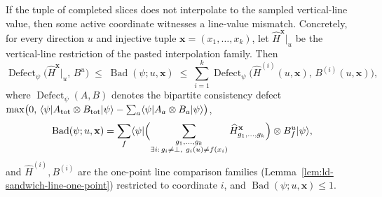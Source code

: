 \begin{lemma}\label{lem:line-interpolation-mismatch-estimates}
	\leanok
	If the tuple of completed slices does not interpolate to the sampled
	vertical-line value, then some active coordinate witnesses a line-value
	mismatch. Concretely, for every direction $u$ and injective tuple
	$\mathbf{x}=(x_1,\dots,x_k)$, let $\widehat{H}^{\mathbf{x}}\rvert_u$ be the
	vertical-line restriction of the pasted interpolation family. Then
	\[
		\operatorname{Defect}_\psi\bigl(
			\widehat{H}^{\mathbf{x}}\rvert_u,\,
			B^u\bigr)
		\;\le\;
		\operatorname{Bad}(\psi;u,\mathbf{x})
		\;\le\;
		\sum_{i=1}^k
		\operatorname{Defect}_\psi\bigl(
			\widehat{H}^{(i)}(u,\mathbf{x}),\,
			B^{(i)}(u,\mathbf{x})\bigr),
	\]
	where $\operatorname{Defect}_\psi(A,B)$ denotes the bipartite consistency
	defect $\max\bigl(0,\,
		\langle \psi \rvert A_{\mathrm{tot}}\otimes B_{\mathrm{tot}}\lvert \psi \rangle
		- \sum_a \langle \psi \rvert A_a\otimes B_a\lvert \psi \rangle\bigr)$,
		\[
			\operatorname{Bad}(\psi;u,\mathbf{x})
			= \sum_f \langle \psi \rvert
			\Bigl(\sum_{\substack{g_1,\dots,g_k\\ \exists i:\, g_i\ne\bot,\ g_i(u)\ne f(x_i)}}
				\widehat H_{g_1,\dots,g_k}^{\mathbf{x}}
			\Bigr) \otimes B_f^u
			\lvert \psi \rangle,
		\]
		and $\widehat{H}^{(i)},B^{(i)}$ are the one-point line comparison
		families (Lemma~\ref{lem:ld-sandwich-line-one-point})
		restricted to coordinate $i$, and $\operatorname{Bad}(\psi;u,\mathbf{x})\le 1$.
\end{lemma}

